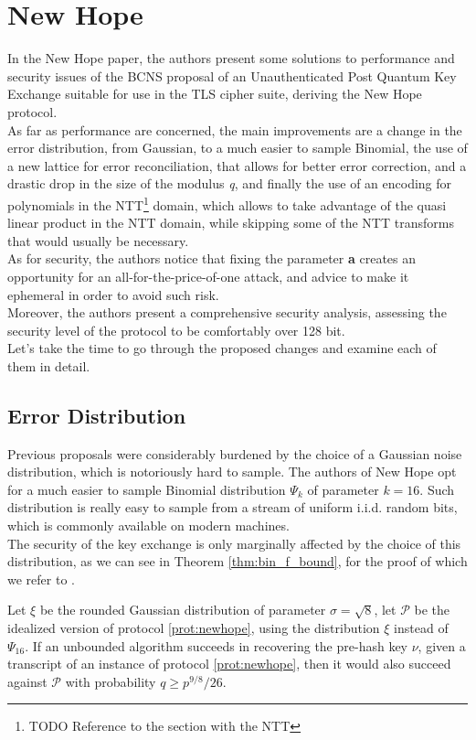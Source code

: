 \section{New Hope}
In the New Hope paper\cite{newhope}, the authors present some solutions to performance and security issues of the BCNS proposal \cite{BCNS} of an Unauthenticated Post Quantum Key Exchange suitable for use in the TLS cipher suite, deriving the New Hope protocol. \\
As far as performance are concerned, the main improvements are a change in the error distribution, from Gaussian, to a much easier to sample Binomial, the use of a new lattice for error reconciliation, that allows for better error correction, and a drastic drop in the size of the modulus \textit{q}, and finally the use of an encoding for polynomials in the NTT\footnote{TODO Reference to the section with the NTT} domain, which allows to take advantage of the quasi linear product in the NTT domain, while skipping some of the NTT transforms that would usually be necessary.\\
As for security, the authors notice that fixing the parameter \textbf{a} creates an opportunity for an all-for-the-price-of-one attack, and advice to make it ephemeral in order to avoid such risk.\\
Moreover, the authors present a comprehensive security analysis, assessing the security level of the protocol to be comfortably over 128 bit.\\
Let's take the time to go through the proposed changes and examine each of them in detail.

\subsection{Error Distribution}
Previous proposals were considerably burdened by the choice of a Gaussian noise distribution, which is notoriously hard to sample. The authors of New Hope opt for a much easier to sample Binomial distribution $\Psi_k$ of parameter $k=16$. Such distribution is really easy to sample from a stream of uniform i.i.d. random bits, which is commonly available on modern machines. \\
The security of the key exchange is only marginally affected by the choice of this distribution, as we can see in Theorem \ref{thm:bin_f_bound}, for the proof of which we refer to \cite{newhope}.

\begin{theorem}\label{thm:bin_f_bound}
Let $\xi$ be the rounded Gaussian distribution of parameter $\sigma = \sqrt{8}$, let $\mathscr{P}$ be the idealized version of protocol \ref{prot:newhope}, using the distribution $\xi$ instead of $\Psi_16$. If an unbounded algorithm succeeds in recovering the pre-hash key $\nu$, given a transcript of an instance of protocol \ref{prot:newhope}, then it would also succeed against $\mathscr{P}$ with probability $q\ge p^{9/8}/26$.
\end{theorem}

